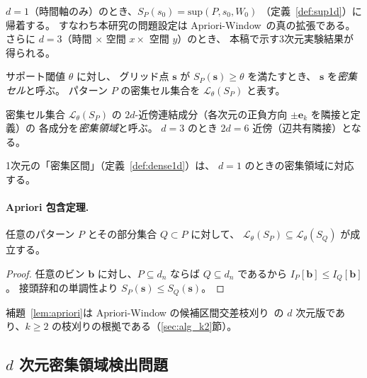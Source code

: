 \begin{remark}[1次元設定への帰着]\label{rem:1d_reduction}
$d = 1$（時間軸のみ）のとき、$S_P(s_0) = \mathrm{sup}(P, s_0, W_0)$
（定義~\ref{def:sup1d}）に帰着する。
すなわち本研究の問題設定は Apriori-Window~\cite{aprioriwindow}の真の拡張である。
さらに $d = 3$（時間 $\times$ 空間 $x \times$ 空間 $y$）のとき、
本稿で示す3次元実験結果が得られる。
\end{remark}

\begin{definition}[密集セル]\label{def:dense_cell_nd}
サポート閾値 $\theta$ に対し、
グリッド点 $\bm{s}$ が
$S_P(\bm{s}) \geq \theta$ を満たすとき、
$\bm{s}$ を\emph{密集セル}と呼ぶ。
パターン $P$ の密集セル集合を
$\mathcal{L}_\theta(S_P)$ と表す。
\end{definition}

\begin{definition}[密集領域]\label{def:dense_region_nd}
密集セル集合 $\mathcal{L}_\theta(S_P)$ の
$2d$-近傍連結成分（各次元の正負方向 $\pm \bm{e}_k$ を隣接と定義）の
各成分を\emph{密集領域}と呼ぶ。
$d = 3$ のとき $2d = 6$ 近傍（辺共有隣接）となる。
\end{definition}

1次元の「密集区間」（定義~\ref{def:dense1d}）は、
$d = 1$ のときの密集領域に対応する。

\paragraph{Apriori 包含定理.}

\begin{lemma}[密集領域の単調性]\label{lem:apriori}
任意のパターン $P$ とその部分集合 $Q \subset P$ に対して、
$\mathcal{L}_\theta(S_P) \subseteq \mathcal{L}_\theta(S_Q)$ が成立する。
\end{lemma}

\begin{proof}
任意のビン $\bm{b}$ に対し、$P \subseteq d_n$ ならば $Q \subseteq d_n$ であるから
$I_P[\bm{b}] \leq I_Q[\bm{b}]$。
接頭辞和の単調性より $S_P(\bm{s}) \leq S_Q(\bm{s})$。
\end{proof}

補題~\ref{lem:apriori}は Apriori-Window の候補区間交差枝刈り~\cite{aprioriwindow}の
$d$ 次元版であり、$k \geq 2$ の枝刈りの根拠である（\ref{sec:alg_k2}節）。

\subsection{$d$ 次元密集領域検出問題}

